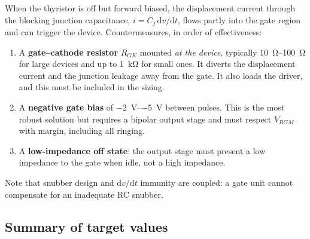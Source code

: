 \documentclass[11pt,a4paper]{article}
\begin{document}
When the thyristor is off but forward biased, the displacement current through the
blocking junction capacitance, $i = C_j\,\mathrm{d}v/\mathrm{d}t$, flows partly
into the gate region and can trigger the device. Countermeasures, in order of
effectiveness:

\begin{enumerate}
  \item A \textbf{gate--cathode resistor} $R_{GK}$ mounted \emph{at the device},
        typically \SIrange{10}{100}{\ohm} for large devices and up to
        \SI{1}{\kilo\ohm} for small ones. It diverts the displacement current and
        the junction leakage away from the gate. It also loads the driver, and this
        must be included in the sizing.
  \item A \textbf{negative gate bias} of \SIrange{-2}{-5}{\volt} between pulses.
        This is the most robust solution but requires a bipolar output stage and
        must respect $V_{RGM}$ with margin, including all ringing.
  \item A \textbf{low-impedance off state}: the output stage must present a low
        impedance to the gate when idle, not a high impedance.
\end{enumerate}

Note that snubber design and $\mathrm{d}v/\mathrm{d}t$ immunity are coupled: a
gate unit cannot compensate for an inadequate RC snubber.

\subsection{Summary of target values}
\end{document}

